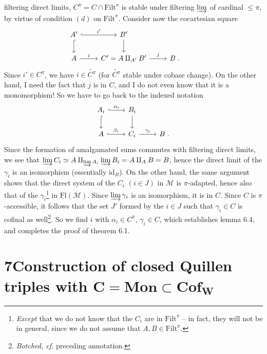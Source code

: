 \documentclass[11pt]{article}
\newcommand{\msp}[1]{\marginpar{\footnotesize [#1]}}
\newcommand{\M}{\mathcal{M}}
\newcommand{\Filt}{\mathrm{Filt}}
\newcommand{\Fl}{\mathrm{Fl}}
\begin{document}
\msp{page 83}
filtering direct limits, $C^{\pi} = C \cap \Filt^{\pi}$ is stable under filtering $\varinjlim$ of cardinal $\leq \pi$, by virtue of condition $(d)$ on $\Filt^{\pi}$. Consider now the cocartesian square
\[
\begin{tikzcd}
A' \arrow[r, hook, "i'"] \arrow[d, hook] & B' \arrow[d] & & \\
A \arrow[r, "i"] & C' = A \amalg_{A'} B' \arrow[r, "j"] & B \;.
\end{tikzcd}
\]
Since $i' \in C^{\pi}$, we have $i \in \widetilde{C^{\pi}}$ (for $\widetilde{C^{\pi}}$ stable under cobase change). On the other hand, I need the fact that $j$ is in $C$, and I do not even know that it is a monomorphism! So we have to go back to the indexed notation
\[
\begin{tikzcd}
A_i \arrow[r, hook, "\alpha_i"] \arrow[d, hook] & B_i \arrow[d] & \\
A \arrow[r, hook, "\beta_i"] & C_i \arrow[r, "\gamma_i"] & B \;.
\end{tikzcd}
\]
Since the formation of amalgamated sums commutes with filtering direct limits, we see that $\varinjlim C_i \simeq A \amalg_{\varinjlim A_i} \varinjlim B_i = A \amalg_A B = B$, hence the direct limit of the $\gamma_i$ is an isomorphism (essentially $\mathrm{id}_B$). On the other hand, the same argument shows that the direct system of the $C_i$ $(i \in J)$ in $\M$ is $\pi$-adapted, hence also that of the $\gamma_i$\footnote[28]{\textit{Except} that we do not know that the $C_i$ are in $\Filt^{\pi}$ -- in fact, they will not be in general, since we do not assume that $A, B \in \Filt^{\pi}$.}
\msp{page 84}
in $\underline{\Fl}(\M)$. Since $\varinjlim \gamma_i$ is an isomorphism, it is in $C$. Since $C$ is $\pi$-accessible, it follows that the set $J'$ formed by the $i \in J$ such that $\gamma_i \in C$ is cofinal as well\footnote[29]{\textit{Botched, cf.} preceding annotation.}. So we find $i$ with $\alpha_i \in C^{\pi}$, $\gamma_i \in C$, which establishes lemma 6.4, and completes the proof of theorem 6.1.

\section*{7\quad Construction of closed Quillen triples with $\boldsymbol{C} = \mathbf{Mon} \subset \mathbf{Cof}_{\boldsymbol{W}}$}
\end{document}
